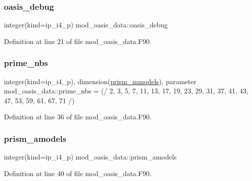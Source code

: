 \subsubsection{\texorpdfstring{oasis\+\_\+debug}{oasis\_debug}}
{\footnotesize\ttfamily integer(kind=ip\+\_\+i4\+\_\+p) mod\+\_\+oasis\+\_\+data\+::oasis\+\_\+debug}



Definition at line 21 of file mod\+\_\+oasis\+\_\+data.\+F90.

\mbox{\label{namespacemod__oasis__data_a56cd74c9147ef028573f2d5eb5e06fdc}} 
\subsubsection{\texorpdfstring{prime\+\_\+nbs}{prime\_nbs}}
{\footnotesize\ttfamily integer(kind=ip\+\_\+i4\+\_\+p), dimension(\hyperlink{namespacemod__oasis__data_a11c61975c048981f7e508f1b6caf16b6}{prism\+\_\+mmodels}), parameter mod\+\_\+oasis\+\_\+data\+::prime\+\_\+nbs = (/ 2, 3, 5, 7, 11, 13, 17, 19, 23, 29, 31, 37, 41, 43, 47, 53, 59, 61, 67, 71 /)}



Definition at line 36 of file mod\+\_\+oasis\+\_\+data.\+F90.

\mbox{\label{namespacemod__oasis__data_ac73f95bc17215d09b67c6c4d3adc07b7}} 
\subsubsection{\texorpdfstring{prism\+\_\+amodels}{prism\_amodels}}
{\footnotesize\ttfamily integer(kind=ip\+\_\+i4\+\_\+p) mod\+\_\+oasis\+\_\+data\+::prism\+\_\+amodels}



Definition at line 40 of file mod\+\_\+oasis\+\_\+data.\+F90.

\mbox{\label{namespacemod__oasis__data_a11c61975c048981f7e508f1b6caf16b6}} 
